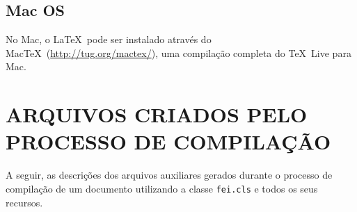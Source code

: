 \documentclass{fei}
\begin{document}
	\section{Mac OS}
	
	No Mac, o \LaTeX\ pode ser instalado através do Mac\TeX\ (\url{http://tug.org/mactex/}), uma compilação completa do \TeX\ Live para Mac.

	
	\appendix
	
	\chapter{ARQUIVOS CRIADOS PELO PROCESSO DE COMPILAÇÃO}
	
	A seguir, as descrições dos arquivos auxiliares gerados durante o processo de compilação de um documento utilizando a classe \texttt{fei.cls} e todos os seus recursos.
		
\end{document}
